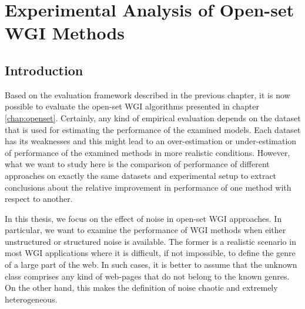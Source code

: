 
\chapter{Experimental Analysis of Open-set WGI Methods}

\label{chap:noise}


\newcommand{\keyword}[1]{\textbf{#1}}
\newcommand{\tabhead}[1]{\textbf{#1}}
\newcommand{\code}[1]{\texttt{#1}}
\newcommand{\file}[1]{\texttt{\bfseries#1}}
\newcommand{\option}[1]{\texttt{\itshape#1}}


\section{Introduction}\label{chap:noise:sec:intro}

Based on the evaluation framework described in the previous chapter, it is now possible to evaluate the open-set WGI algorithms presented in chapter \ref{chap:openset}. Certainly, any kind of empirical evaluation depends on the dataset that is used for estimating the performance of the examined models. Each dataset has its weaknesses and this might lead to an over-estimation or under-estimation of performance of the examined methods in more realistic conditions. However, what we want to study here is the comparison of performance of different approaches on exactly the same datasets and experimental setup to extract conclusions about the relative improvement in performance of one method with respect to another.

In this thesis, we focus on the effect of noise in open-set WGI approaches. In particular, we want to examine the performance of WGI methods when either unstructured or structured noise is available. The former is a realistic scenario in most WGI applications where it is difficult, if not impossible, to define the genre of a large part of the web. In such cases, it is better to assume that the unknown class comprises any kind of web-pages that do not belong to the known genres. On the other hand, this makes the definition of noise chaotic and extremely heterogeneous. 

